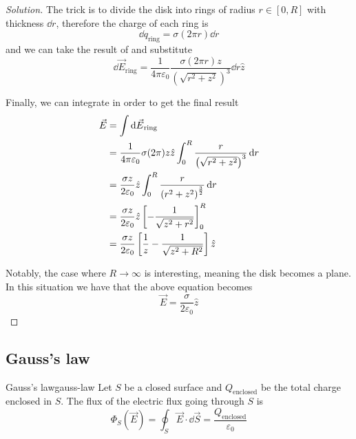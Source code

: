 \documentclass[12pt]{extarticle}
\begin{document}
\begin{proof}[Solution]
    The trick is to divide the disk into rings of radius $r \in [0, R]$ with thickness $\dd{r}$, therefore the charge of each ring is
    \begin{equation}
        \dd{q}_\text{ring} = \sigma (2 \pi r) \dd{r}
    \end{equation}
    and we can take the result of  and substitute
    \begin{equation}
        \dd{\vec E}_\text{ring} = \frac{1}{4 \pi \varepsilon_0} \frac{\sigma (2 \pi r) z}{\left(\sqrt{r^2 + z^2}\right)^3} \dd{r} \hat z
    \end{equation}

    Finally, we can integrate in order to get the final result
    \begin{align}
        \vec E & = \int \dd{\vec E}_\text{ring}                                                                                    \\
               & = \frac{1}{4 \pi \varepsilon_0} \sigma(2 \pi) z  \hat z \int_0^R \frac{r}{\left(\sqrt{r^2 + z^2}\right)^3} \dd{r} \\
               & = \frac{\sigma z}{2 \varepsilon_0} \hat z \int_0^R \frac{r}{\left(r^2 + z^2\right)^{\frac{3}{2}}} \dd{r}          \\
               & = \frac{\sigma z}{2 \varepsilon_0} \hat z \left[ -\frac{1}{\sqrt{z^2 + r^2}} \right]_0^R                          \\
               & = \frac{\sigma z}{2 \varepsilon_0} \left[ \frac{1}{z} - \frac{1}{\sqrt{z^2 + R^2}} \right] \hat z
    \end{align}

    Notably, the case where $R \to \infty$ is interesting, meaning the disk becomes a plane.
    In this situation we have that the above equation becomes
    \begin{equation}
        \vec E = \frac{\sigma}{2 \varepsilon_0} \hat z
    \end{equation}
\end{proof}


\subsection{Gauss's law}

\begin{theorem}{Gauss's law}{gauss-law}
    Let $S$ be a closed surface and $Q_\text{enclosed}$ be the total charge enclosed in $S$.
    The flux of the electric flux going through $S$ is
    \begin{equation}
        \Phi_S(\vec E) = \oint_S \vec E \cdot \dd{\vec S} = \frac{Q_\text{enclosed}}{\varepsilon_0}
    \end{equation}
\end{theorem}
\end{document}
